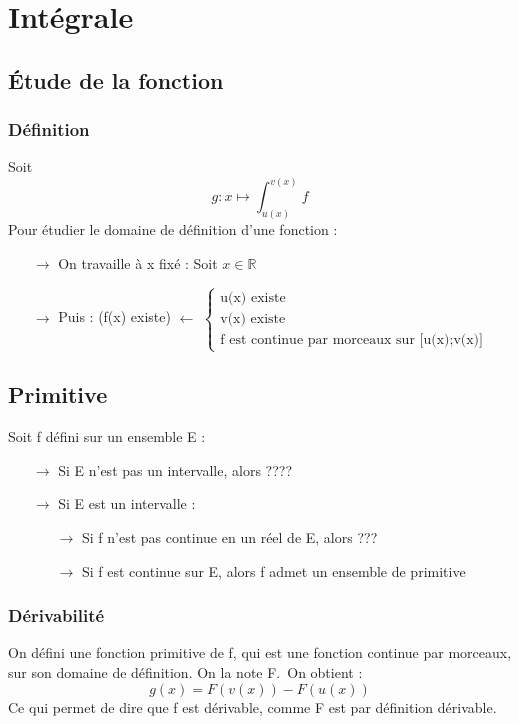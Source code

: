 \chapter{Intégrale}
\section{Étude de la fonction}
\subsection{Définition}
Soit $$g: x\mapsto \int_{u(x)}^{v(x)} f$$
Pour étudier le domaine de définition d'une fonction :
\begin{itemize}
 \item[{$\rightarrow$}] On travaille à x fixé : Soit $x \in \mathbb{R}$
 \item[{$\rightarrow$}] Puis : (f(x) existe) $\leftarrow$
$\left\{\begin{array}{l}
   \mbox{u(x) existe}\\
   \mbox{v(x) existe} \\
   \mbox{f est continue par morceaux sur [u(x);v(x)]}
  \end{array}\right. $
\end{itemize}
\section{Primitive}
Soit f défini sur un ensemble E : 
\begin{itemize}
 \item[$\rightarrow$] Si E n'est pas un intervalle, alors ????
 \item[$\rightarrow$] Si E est un intervalle : \begin{itemize}
 \item[$\rightarrow$]Si f n'est pas continue en un réel de E, alors ???
 \item[$\rightarrow$]Si f est continue sur E, alors f admet un ensemble de primitive

\end{itemize}


\end{itemize}

\subsection{Dérivabilité}
On défini une fonction primitive de f, qui est une fonction continue par morceaux, sur son domaine de définition. On la note F.\ On obtient :
$$g(x) = F(v(x)) - F(u(x))$$
Ce qui permet de dire que f est dérivable, comme F est par définition dérivable.
